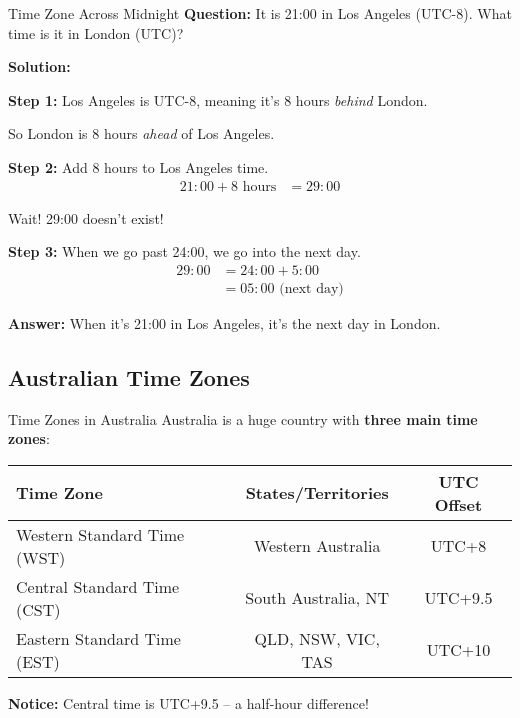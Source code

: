 \documentclass[12pt,a4paper]{article}
\begin{document}
\begin{examplebox}{Time Zone Across Midnight}
\textbf{Question:} It is 21:00 in Los Angeles (UTC-8). What time is it in London (UTC)?

\textbf{Solution:}

\textbf{Step 1:} Los Angeles is UTC-8, meaning it's 8 hours \textit{behind} London.

So London is 8 hours \textit{ahead} of Los Angeles.

\textbf{Step 2:} Add 8 hours to Los Angeles time.
\begin{align*}
21:00 + 8\text{ hours} &= 29:00
\end{align*}

Wait! 29:00 doesn't exist!

\textbf{Step 3:} When we go past 24:00, we go into the next day.
\begin{align*}
29:00 &= 24:00 + 5:00 \\
&= 05:00 \text{ (next day)}
\end{align*}

\textbf{Answer:} When it's 21:00 in Los Angeles, it's  the next day in London.
\end{examplebox}

\subsection{Australian Time Zones}

\begin{conceptbox}{Time Zones in Australia}
Australia is a huge country with \textbf{three main time zones}:

\begin{center}
\begin{tabular}{lcc}
\toprule
\textbf{Time Zone} & \textbf{States/Territories} & \textbf{UTC Offset} \\
\midrule
Western Standard Time (WST) & Western Australia & UTC+8 \\
Central Standard Time (CST) & South Australia, NT & UTC+9.5 \\
Eastern Standard Time (EST) & QLD, NSW, VIC, TAS & UTC+10 \\
\bottomrule
\end{tabular}
\end{center}

\textbf{Notice:} Central time is UTC+9.5 -- a half-hour difference!
\end{conceptbox}
\end{document}
